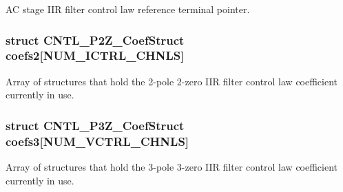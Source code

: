 A\-C stage I\-I\-R filter control law reference terminal pointer. \hypertarget{a00010_a0e862b208ff3b2bb45fcfce1ccd74cd2}{
\subsubsection[{coefs2}]{\setlength{\rightskip}{0pt plus 5cm}struct C\-N\-T\-L\-\_\-P2\-Z\-\_\-\-Coef\-Struct coefs2\mbox{[}{\bf N\-U\-M\-\_\-\-I\-C\-T\-R\-L\-\_\-\-C\-H\-N\-L\-S}\mbox{]}}}\label{a00010_a0e862b208ff3b2bb45fcfce1ccd74cd2}
Array of structures that hold the 2-\/pole 2-\/zero I\-I\-R filter control law coefficient currently in use. \hypertarget{a00010_a84b8a9f9bc8749e7ad42eea593f858c4}{
\subsubsection[{coefs3}]{\setlength{\rightskip}{0pt plus 5cm}struct C\-N\-T\-L\-\_\-P3\-Z\-\_\-\-Coef\-Struct coefs3\mbox{[}{\bf N\-U\-M\-\_\-\-V\-C\-T\-R\-L\-\_\-\-C\-H\-N\-L\-S}\mbox{]}}}\label{a00010_a84b8a9f9bc8749e7ad42eea593f858c4}
Array of structures that hold the 3-\/pole 3-\/zero I\-I\-R filter control law coefficient currently in use. 